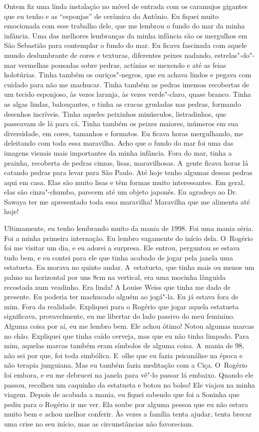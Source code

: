 Ontem fiz uma linda instalação no móvel de entrada com os caramujos
gigantes que eu tenho e as ``esponjas'' de cerâmica do Antônio. Eu
fiquei muito emocionada com esse trabalho dele, que me lembrou o fundo
do mar da minha infância. Uma das melhores lembranças da minha infância
são os mergulhos em São Sebastião para contemplar o fundo do mar. Eu
ficava fascinada com aquele mundo deslumbrante de cores e texturas,
diferentes peixes nadando, estrelas"-do"-mar vermelhas pousadas sobre
pedras, actínias se mexendo e até as feias holotúrias. Tinha também os
ouriços"-negros, que eu achava lindos e pegava com cuidado para não me
machucar. Tinha também as pedras imensas recobertas de um tecido
esponjoso, às vezes laranja, às vezes verde"-claro, quase branco. Tinha
as algas lindas, balouçantes, e tinha as cracas grudadas nas pedras,
formando desenhos incríveis. Tinha aqueles peixinhos minúsculos,
listradinhos, que passeavam de lá para cá. Tinha também os peixes
maiores, inúmeros em sua diversidade, em cores, tamanhos e formatos. Eu
ficava horas mergulhando, me deleitando com toda essa maravilha. Acho
que o fundo do mar foi uma das imagens visuais mais importantes da minha
infância. Fora do mar, tinha a prainha, recoberta de pedras cinzas,
lisas, maravilhosas. A~gente ficava horas lá catando pedras para levar
para São Paulo. Até hoje tenho algumas dessas pedras aqui em casa. Elas
são muito lisas e têm formas muito interessantes. Em geral, elas são
cinza"-chumbo, parecem até um objeto japonês. Eu agradeço ao Dr. Sawaya
ter me apresentado toda essa maravilha! Maravilha que me alimenta até
hoje!

Ultimamente, eu tenho lembrando muito da mania de 1998. Foi uma mania
séria. Foi a minha primeira internação. Eu lembro vagamente do início
dela. O~Rogério foi me visitar um dia, e eu adorei a surpresa. Ele
entrou, perguntou se estava tudo bem, e eu contei para ele que tinha
acabado de jogar pela janela uma estatueta. Eu morava no quinto andar. A~estatueta, que tinha mais ou menos um palmo na horizontal por uns 8cm na
vertical, era uma mocinha lânguida recostada num veadinho. Era linda! A
Louise Weiss que tinha me dado de presente. Eu poderia ter machucado
alguém ao jogá"-la. Eu já estava fora de mim. Fora da realidade.
Expliquei para o Rogério que jogar aquela estatueta significava,
provavelmente, eu me libertar do lado passivo do meu feminino. Alguma
coisa por aí, eu me lembro bem. Ele achou ótimo! Notou algumas marcas no
chão. Expliquei que tinha caído cerveja, mas que eu não tinha limpado.
Para mim, aquelas marcas também eram símbolos de alguma coisa. A~mania
de 98, não sei por que, foi toda simbólica. E~olhe que eu fazia
psicanálise na época e não terapia junguiana. Mas eu também fazia
meditação com a Ciça. O~Rogério foi embora, e eu me debrucei na janela
para vê"-lo passar lá embaixo. Quando ele passou, recolheu um caquinho da
estatueta e botou no bolso! Ele viajou na minha viagem. Depois de
acabada a mania, eu fiquei sabendo que foi a Soninha que pediu para o
Rogério ir me ver. Ela soube por alguma pessoa que eu não estava muito
bem e achou melhor conferir. Às vezes a família tenta ajudar, tenta
brecar uma crise no seu início, mas as circunstâncias não favoreciam.

